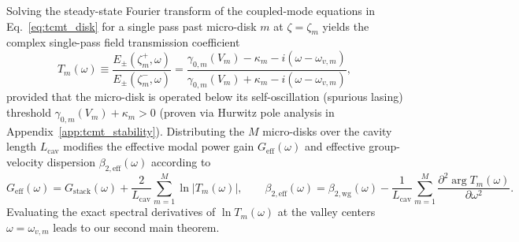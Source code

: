 \documentclass[11pt,letterpaper]{article}
\begin{document}
Solving the steady-state Fourier transform of the coupled-mode equations in Eq.~\eqref{eq:tcmt_disk} for a single pass past micro-disk $m$ at $\zeta = \zeta_m$ yields the complex single-pass field transmission coefficient
\begin{equation}
T_m(\omega) \equiv \frac{E_\pm(\zeta_m^+, \omega)}{E_\pm(\zeta_m^-, \omega)} = \frac{\gamma_{0,m}(V_m) - \kappa_m - i(\omega - \omega_{v,m})}{\gamma_{0,m}(V_m) + \kappa_m - i(\omega - \omega_{v,m})},
\label{eq:tcmt_transfer}
\end{equation}
provided that the micro-disk is operated below its self-oscillation (spurious lasing) threshold $\gamma_{0,m}(V_m) + \kappa_m > 0$ (proven via Hurwitz pole analysis in Appendix~\ref{app:tcmt_stability}). Distributing the $M$ micro-disks over the cavity length $L_{\mathrm{cav}}$ modifies the effective modal power gain $G_{\mathrm{eff}}(\omega)$ and effective group-velocity dispersion $\beta_{2,\mathrm{eff}}(\omega)$ according to
\begin{equation}
G_{\mathrm{eff}}(\omega) = G_{\mathrm{stack}}(\omega) + \frac{2}{L_{\mathrm{cav}}}\sum_{m=1}^M \ln |T_m(\omega)|, \qquad \beta_{2,\mathrm{eff}}(\omega) = \beta_{2,\mathrm{wg}}(\omega) - \frac{1}{L_{\mathrm{cav}}}\sum_{m=1}^M \frac{\partial^2 \arg T_m(\omega)}{\partial \omega^2}.
\label{eq:eff_gain_gvd}
\end{equation}
Evaluating the exact spectral derivatives of $\ln T_m(\omega)$ at the valley centers $\omega = \omega_{v,m}$ leads to our second main theorem.
\end{document}

